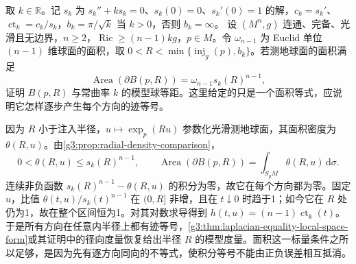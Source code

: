 \begin{exercise}\label{g3:ex:sphere-area-equality-rigidity}
	取 \(k\in\mathbb R\)。记 \(s_k\) 为 \(s_k''+ks_k=0\)、\(s_k(0)=0\)、\(s_k'(0)=1\) 的解，\(c_k=s_k'\)、\(\operatorname{ct}_k=c_k/s_k\)，\(b_k=\pi/\sqrt k\) 当 \(k>0\)，否则 \(b_k=\infty\)。
	设 \((M^n,g)\) 连通、完备、光滑且无边界，\(n\ge2\)，\(\operatorname{Ric}\ge(n-1)kg\)，\(p\in M\)。令 \(\omega_{n-1}\) 为 Euclid 单位 \((n-1)\) 维球面的面积，取 \(0<R<\min\{\operatorname{inj}_g(p),b_k\}\)。若测地球面的面积满足
	\[
		\operatorname{Area}(\partial B(p,R))=\omega_{n-1}s_k(R)^{n-1},
	\]
	证明 \(B(p,R)\) 与常曲率 \(k\) 的模型球等距。这里给定的只是一个面积等式，应说明它怎样逐步产生每个方向的迹等号。
\end{exercise}
\begin{solution}
	因为 \(R\) 小于注入半径，\(u\mapsto\exp_p(Ru)\) 参数化光滑测地球面，其面积密度为 \(\theta(R,u)\)。由\cref{g3:prop:radial-density-comparison}，
	\[
		0<\theta(R,u)\le s_k(R)^{n-1},\qquad
		\operatorname{Area}(\partial B(p,R))=\int_{S_pM}\theta(R,u)\,\mathrm{d}\sigma.
	\]
	连续非负函数 \(s_k(R)^{n-1}-\theta(R,u)\) 的积分为零，故它在每个方向都为零。固定 \(u\)，比值 \(\theta(t,u)/s_k(t)^{n-1}\) 在 \((0,R]\) 非增，且在 \(t\downarrow0\) 时趋于1；如今它在 \(R\) 处仍为1，故在整个区间恒为1。对其对数求导得到 \(h(t,u)=(n-1)\operatorname{ct}_k(t)\)。于是所有方向在任意内半径上都有迹等号，\cref{g3:thm:laplacian-equality-local-space-form}或其证明中的径向度量恢复给出半径 \(R\) 的模型度量。面积这一标量条件之所以足够，是因为先有逐方向同向的不等式，使积分等号不能由正负误差相互抵消。
\end{solution}

